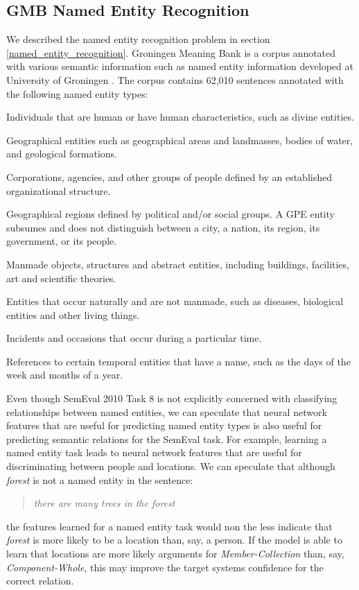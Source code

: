 \subsection{GMB Named Entity Recognition}
We described the named entity recognition problem in section \ref{named_entity_recognition}. Groningen Meaning Bank is a corpus annotated with various semantic information such as named entity information developed at University of Groningen \citep{basile2012}. The corpus contains 62,010 sentences annotated with the following named entity types:

\begin{description}[labelindent=4em, leftmargin=4em]
	\item [Person] Individuals that are human or have human characteristics, such as divine entities.
	\item [Location]  Geographical entities such as geographical areas and landmasses, bodies of water, and geological formations.
	\item [Organization] Corporations, agencies, and other groups of people defined by an established organizational structure.
	\item [Geo-Political Entity] Geographical regions defined by political and/or social groups. A GPE entity subsumes and does not distinguish between a city, a nation, its region, its government, or its people.
	\item [Artifact] Manmade objects, structures and abstract entities, including buildings, facilities, art and scientific theories.
	\item [Natural Object] Entities that occur naturally and are not manmade, such as diseases, biological entities and other living things.
	\item [Event] Incidents and occasions that occur during a particular time.
	\item [Time] References to certain temporal entities that have a name, such as the days of the week and months of a year.
\end{description}
\noindent
Even though SemEval 2010 Task 8 is not explicitly concerned with classifying relationships between named entities, we can speculate that neural network features that are useful for predicting named entity types is also useful for predicting semantic relations for the SemEval task. For example, learning a named entity task leads to neural network features that are useful for discriminating between people and locations. We can speculate that although \textit{forest} is not a named entity in the sentence:
\begin{quote}
\textit{there are many trees in the forest}	
\end{quote}
the features learned for a named entity task would non the less indicate that \textit{forest} is more likely to be a location than, say, a person. If the model is able to learn that locations are more likely arguments for \textit{Member-Collection} than, say, \textit{Component-Whole}, this may improve the target systems confidence for the correct relation.